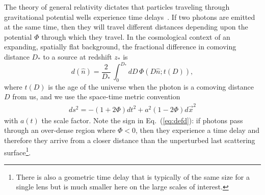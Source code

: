 \documentclass[prd,amsmath,amssymb,floatfix,superscriptaddress,nofootinbib,twocolumn]{revtex4-1}
\def\be{\begin{equation}}
\def\ee{\end{equation}}
\def\bea{\begin{eqnarray}}
\def\eea{\end{eqnarray}}
\newcommand{\ec}[1]{Eq.~(\ref{eq:#1})}
\newcommand{\eql}[1]{\label{eq:#1}}
\newcommand{\wh}[1]{{\color{red} #1}}
\begin{document}
The theory of general relativity dictates that particles traveling through gravitational potential wells experience time delays~\cite{1964PhRvL..13..789S}. If two photons are emitted at the same time, then they will travel different distances depending upon the potential $\Phi$ through which they travel. In the cosmological context of an expanding,  spatially flat background, the %
fractional difference in comoving distance
$D_*$ to a source at redshift $z_*$ is 
\be
d(\hat n) = \frac{2}{D_*}\, \int_0^{D_*} dD\, \Phi\left(D \hat n; t(D)\right)\eql{defd},
\ee
where %
$t(D)$ is the age of the universe when the photon is a comoving distance $D$ from us, and  we use the space-time metric convention 
\bea
ds^{2}= -(1+2\Phi)dt^{2}+a^{2}(1-2\Phi)d\vec{x}^{2}
\eea
with $a(t)$ the scale factor.
Note the sign in \ec{defd}: if photons pass through an over-dense region where $\Phi<0$, then they experience a time delay and therefore they arrive from a closer distance than the unperturbed last scattering surface\footnote{There is also a geometric time delay that is typically of the same size for a single lens but is much smaller here on the large scales of interest.}. %
\end{document}
